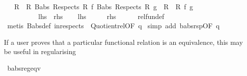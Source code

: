 \begin{isabellebody}
\ \ \ {\isachardoublequoteopen}{\isacharparenleft}{\kern0pt}{\isacharparenleft}{\kern0pt}R{}\ {\isacharequal}{\kern0pt}{\isacharequal}{\kern0pt}{\isacharequal}{\kern0pt}{\isachargreater}{\kern0pt}\ R{}{\isacharparenright}{\kern0pt}\ {\isacharparenleft}{\kern0pt}Babs\ {\isacharparenleft}{\kern0pt}Respects\ R{}{\isacharparenright}{\kern0pt}\ f{\isacharparenright}{\kern0pt}\ {\isacharparenleft}{\kern0pt}Babs\ {\isacharparenleft}{\kern0pt}Respects\ R{}{\isacharparenright}{\kern0pt}\ g{\isacharparenright}{\kern0pt}{\isacharparenright}{\kern0pt}\ {\isacharequal}{\kern0pt}\ {\isacharparenleft}{\kern0pt}{\isacharparenleft}{\kern0pt}R{}\ {\isacharequal}{\kern0pt}{\isacharequal}{\kern0pt}{\isacharequal}{\kern0pt}{\isachargreater}{\kern0pt}\ R{}{\isacharparenright}{\kern0pt}\ f\ g{\isacharparenright}{\kern0pt}{\isachardoublequoteclose}\isanewline
\ \ \ \ \ \ \ \ \ {\isacharparenleft}{\kern0pt}\ {\isachardoublequoteopen}{\isacharquery}{\kern0pt}lhs\ {\isacharequal}{\kern0pt}\ {\isacharquery}{\kern0pt}rhs{\isachardoublequoteclose}{\isacharparenright}{\kern0pt}\isanewline
%
\isadelimproof
%
\endisadelimproof
%
\isatagproof
{}\isamarkupfalse%
\isanewline
\ \ \isamarkupfalse%
\ {\isacharquery}{\kern0pt}lhs\isanewline
\ \ \isamarkupfalse%
\ \isamarkupfalse%
\ {\isacharquery}{\kern0pt}rhs\isanewline
\ \ \ \ \isamarkupfalse%
\ rel{\isacharunderscore}{\kern0pt}fun{\isacharunderscore}{\kern0pt}def\ \isamarkupfalse%
\ {\isacharparenleft}{\kern0pt}metis\ Babs{\isacharunderscore}{\kern0pt}def\ in{\isacharunderscore}{\kern0pt}respects\ \ Quotient{}{\isacharunderscore}{\kern0pt}rel{\isacharbrackleft}{\kern0pt}OF\ q{\isacharbrackright}{\kern0pt}{\isacharparenright}{\kern0pt}\isanewline
{}\isamarkupfalse%
\ {\isacharparenleft}{\kern0pt}simp\ add{\isacharcolon}{\kern0pt}\ babs{\isacharunderscore}{\kern0pt}rsp{\isacharbrackleft}{\kern0pt}OF\ q{\isacharbrackright}{\kern0pt}{\isacharparenright}{\kern0pt}%
\endisatagproof
{\isafoldproof}%
%
\isadelimproof
%
\endisadelimproof
%
\begin{isamarkuptext}%
If a user proves that a particular functional relation
   is an equivalence, this may be useful in regularising%
\end{isamarkuptext}\isamarkuptrue%
\isamarkupfalse%
\ babs{\isacharunderscore}{\kern0pt}reg{\isacharunderscore}{\kern0pt}eqv{\isacharcolon}{\kern0pt}\isanewline

\end{isabellebody}
